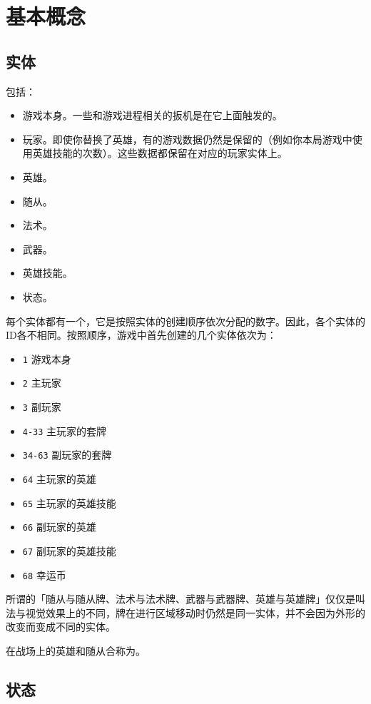 \chapter{基本概念}
\label{basic-concept}

\section{实体}
\label{entity}

包括：
\begin{itemize}
    \item 游戏本身。一些和游戏进程相关的扳机是在它上面触发的。
    \item 玩家。即使你替换了英雄，有的游戏数据仍然是保留的（例如你本局游戏中使用英雄技能的次数）。这些数据都保留在对应的玩家实体上。
    \item 英雄。
    \item 随从。
    \item 法术。
    \item 武器。
    \item 英雄技能。
    \item 状态。
\end{itemize}

每个实体都有一个，它是按照实体的创建顺序依次分配的数字。因此，各个实体的ID各不相同。按照顺序，游戏中首先创建的几个实体依次为：
\begin{itemize}
    \item \texttt{1} 游戏本身
    \item \texttt{2} 主玩家
    \item \texttt{3} 副玩家
    \item \texttt{4-33} 主玩家的套牌
    \item \texttt{34-63} 副玩家的套牌
    \item \texttt{64} 主玩家的英雄
    \item \texttt{65} 主玩家的英雄技能
    \item \texttt{66} 副玩家的英雄
    \item \texttt{67} 副玩家的英雄技能
    \item \texttt{68} 幸运币
\end{itemize}

\notice 所谓的「随从与随从牌、法术与法术牌、武器与武器牌、英雄与英雄牌」仅仅是叫法与视觉效果上的不同，牌在进行区域移动时仍然是同一实体，并不会因为外形的改变而变成不同的实体。

在战场上的英雄和随从合称为。

\section{状态}
\label{enchantment}

